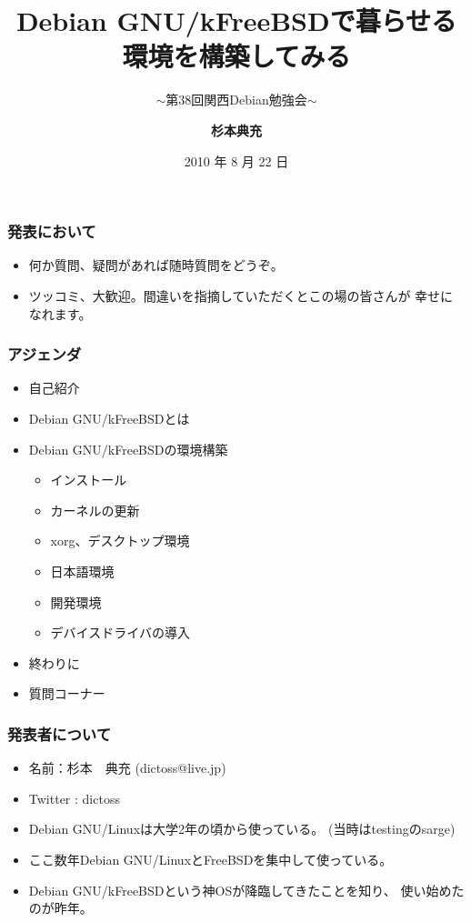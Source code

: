 \documentclass[cjk,dvipdfmx,12pt,%
hyperref={bookmarks=true,bookmarksnumbered=true,bookmarksopen=false,%
colorlinks=false,%
pdftitle={Debian GNU/kFreeBSDで暮らせる環境を構築してみる},%
pdfauthor={杉本典充},%
pdfsubject={第38回関西Debian勉強会},%
}]{beamer}
\title{Debian GNU/kFreeBSDで暮らせる環境を構築してみる}
\subtitle{{\scriptsize{$\sim$第38回関西Debian勉強会$\sim$}}}
\author[杉本 典充]{{\large\bf 杉本典充}}
\institute[]{{\normalsize\tt dictoss@live.jp}}
\date{{\small 2010 年 8 月 22 日}}
\begin{document}
\settitleslide
\begin{frame}
\titlepage
\end{frame}
\setdefaultslide


\begin{frame}[fragile]
\frametitle{発表において}
\begin{itemize}
  \item 何か質問、疑問があれば随時質問をどうぞ。
  \item ツッコミ、大歓迎。間違いを指摘していただくとこの場の皆さんが
幸せになれます。
\end{itemize}
\end{frame}


\begin{frame}[fragile]
\frametitle{アジェンダ}
\begin{itemize}
  \item 自己紹介
  \item Debian GNU/kFreeBSDとは
  \item Debian GNU/kFreeBSDの環境構築
  \begin{itemize}
    \item インストール
    \item カーネルの更新
    \item xorg、デスクトップ環境
    \item 日本語環境
    \item 開発環境
    \item デバイスドライバの導入
  \end{itemize}
  \item 終わりに
  \item 質問コーナー
\end{itemize}
\end{frame}


\begin{frame}[fragile]
\frametitle{発表者について}
\begin{itemize}
  \item 名前：杉本　典充 (dictoss@live.jp)
  \item Twitter : dictoss
  \item Debian GNU/Linuxは大学2年の頃から使っている。
(当時はtestingのsarge)
  \item ここ数年Debian GNU/LinuxとFreeBSDを集中して使っている。
  \item Debian GNU/kFreeBSDという神OSが降臨してきたことを知り、
使い始めたのが昨年。
\end{itemize}
\end{frame}
\end{document}
